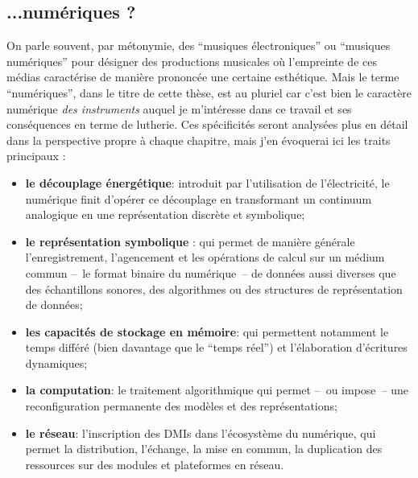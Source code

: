 \subsection*{...numériques ?}

\noindent On parle souvent, par métonymie, des ``musiques électroniques'' ou ``musiques numériques'' pour désigner des productions musicales où l'empreinte de ces médias caractérise de manière prononcée une certaine esthétique. Mais le terme ``numériques'', dans le titre de cette thèse, est au pluriel car c'est bien le caractère numérique \textit{des instruments} auquel je m'intéresse dans ce travail et ses conséquences en terme de lutherie. Ces spécificités seront analysées plus en détail dans la perspective propre à chaque chapitre, mais j'en évoquerai ici les traits principaux :
\vspace{-1em}
\begin{itemize}[noitemsep]
\item \textbf{le découplage énergétique}: introduit par l'utilisation de l'électricité, le numérique finit d'opérer ce découplage en transformant un continuum analogique en une représentation discrète et symbolique;
\item \textbf{le représentation symbolique} : qui permet de manière générale l'enregistrement, l'agencement et les opérations de calcul sur un médium commun --~le format binaire du numérique~-- de données aussi diverses que des échantillons sonores, des algorithmes ou des structures de représentation de données;
\item \textbf{les capacités de stockage en mémoire}: qui permettent notamment le temps différé (bien davantage que le ``temps réel'') et l'élaboration d'écritures dynamiques;
\item \textbf{la computation}: le traitement algorithmique qui permet --~ou impose~-- une reconfiguration permanente des modèles et des représentations;
\item \textbf{le réseau}: l'inscription des \glspl{DMI} dans l'écosystème du numérique, qui permet la distribution, l'échange, la mise en commun, la duplication des ressources sur des modules et plateformes en réseau.
\end{itemize}

